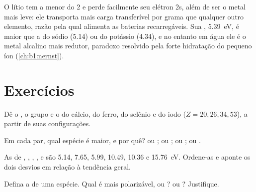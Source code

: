 \begin{example}\label{ex:b1:periodicity:lithium}
O lítio tem a menor  do  2 e perde facilmente
seu elétron 2s, além de ser o metal mais leve: ele transporta mais carga
transferível por grama que qualquer outro elemento, razão pela qual
alimenta as baterias recarregáveis. Sua ,
\qty{5.39}{eV}, é maior que a do sódio (5.14) ou do potássio (4.34), e no
entanto em água ele é o metal alcalino mais redutor, paradoxo resolvido
pela forte hidratação do pequeno íon  (\cref{ch:b1:nernst}).
\end{example}

\section{Exercícios}

\begin{exercise}[$\star$]\label{exo:b1:periodicity:1}
Dê o , o grupo e o  do cálcio, do ferro, do selênio e do
iodo ($Z = 20, 26, 34, 53$), a partir de suas configurações.
\end{exercise}

\begin{exercise}[$\star$]\label{exo:b1:periodicity:2}
Em cada par, qual espécie é maior, e por quê?  ou ;
 ou ;  ou ;  ou .
\end{exercise}

\begin{exercise}[$\star$]\label{exo:b1:periodicity:3}
As  de , , , ,
 e  são 5.14, 7.65, 5.99, 10.49, 10.36 e
\qty{15.76}{eV}. Ordene-as e aponte os dois desvios em relação à
tendência geral.
\end{exercise}

\begin{exercise}[$\star$]\label{exo:b1:periodicity:4}
Defina a  de uma espécie. Qual é mais polarizável, 
ou ?  ou ? Justifique.
\end{exercise}

